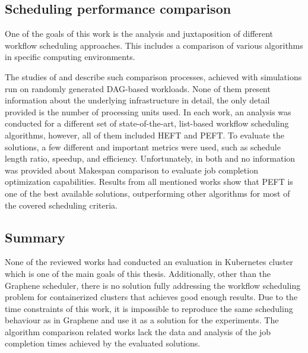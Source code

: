 


\subsection{Scheduling performance comparison}\label{s:RelatedWork:Performance}

One of the goals of this work is the analysis and juxtaposition of different workflow scheduling approaches.
This includes a comparison of various algorithms in specific computing environments.

The studies of \cite{b:Performance-Analysis-Scheduling-DAG} and  \cite{b:Performance-Comparison-Scheduling-DAG} describe such comparison processes, achieved with simulations run on randomly generated DAG-based workloads.
None of them present information about the underlying infrastructure in detail, the only detail provided is the number of processing units used.
In each work, an analysis was conducted for a different set of state-of-the-art, list-based workflow scheduling algorithms, however, all of them included HEFT and PEFT.
To evaluate the solutions, a few different and important metrics were used, such as schedule length ratio, speedup, and efficiency.
Unfortunately, in both \cite{b:Performance-Analysis-Scheduling-DAG} and \cite{b:Performance-Comparison-Scheduling-DAG} no information was provided about Makespan comparison to evaluate job completion optimization capabilities.
Results from all mentioned works show that PEFT is one of the best available solutions, outperforming other algorithms for most of the covered scheduling criteria.



\subsection{Summary}

None of the reviewed works had conducted an evaluation in Kubernetes cluster which is one of the main goals of this thesis.
Additionally, other than the Graphene scheduler, there is no solution fully addressing the workflow scheduling problem for containerized clusters that achieves good enough results. 
Due to the time constraints of this work, it is impossible to reproduce the same scheduling behaviour as in Graphene and use it as a solution for the experiments.
The algorithm comparison related works lack the data and analysis of the job completion times achieved by the evaluated solutions.


